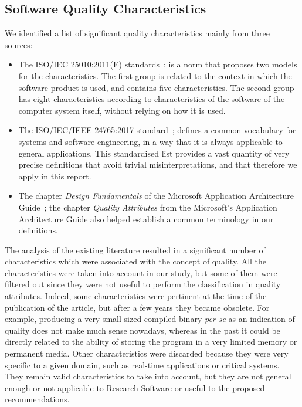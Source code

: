 \documentclass[a4paper]{article}
\begin{document}
\subsection{Software Quality Characteristics}
\label{subsect:sqchar}

We identified a list of significant quality characteristics mainly from three sources:

\begin{itemize}
    \item The ISO/IEC 25010:2011(E) standards~\cite{iso_25010_2011_2017}; is a norm that proposes two models for the characteristics. The first group is related to the context in which the software product is used, and contains five characteristics. The second group has eight characteristics according to characteristics of the software of the computer system itself, without relying on how it is used.

    \item The ISO/IEC/IEEE 24765:2017 standard~\cite{iso_iec_24765_2017}; defines a common vocabulary for systems and software engineering, in a way that it is always applicable to general applications. This standardised list provides a vast quantity of very precise definitions that avoid trivial misinterpretations, and that therefore we apply in this report.

    \item The chapter \textit{Design Fundamentals} of the Microsoft Application Architecture Guide~\cite{microsoft_2010}; the chapter \textit{Quality Attributes} from the Microsoft's Application Architecture Guide also helped establish a common terminology in our definitions.

\end{itemize}

The analysis of the existing literature resulted in a significant number of characteristics which were associated with the concept of quality. All the characteristics were taken into account in our study, but some of them were filtered out since they were not useful to perform the classification in quality attributes. Indeed, some characteristics were pertinent at the time of the publication of the article, but after a few years they became obsolete. For example, producing a very small sized compiled binary \textit{per se} as an indication of quality does not make much sense nowadays, whereas in the past it could be directly related to the ability of storing the program in a very limited memory or permanent media. Other characteristics were discarded because they were very specific to a given domain, such as real-time applications or critical systems. They remain valid characteristics to take into account, but they are not general enough or not applicable to Research Software or useful to the proposed recommendations.
\end{document}
